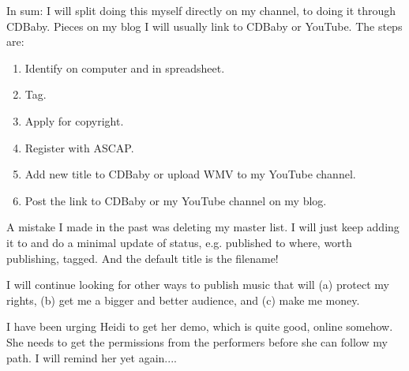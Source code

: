 \documentclass[english,11pt,letterpaper,onecolumn]{scrartcl}
\begin{document}
\noindent In sum: I will split doing this myself directly on my channel, to doing it through CDBaby. Pieces on my blog I will usually link to CDBaby or YouTube. The steps are:

\begin{enumerate}
\item Identify on computer and in spreadsheet.
\item Tag. 
\item Apply for copyright.
\item Register with ASCAP.
\item Add new title to CDBaby or upload WMV to my YouTube channel.
\item Post the link to CDBaby or my YouTube channel on my blog.
\end{enumerate}

A mistake I made in the past was deleting my master list. I will just keep adding it to and do a minimal update of status, e.g. published to where, worth publishing, tagged. And the default title is the filename!

I will continue looking for other ways to publish music that will (a) protect my rights, (b) get me a bigger and better audience, and (c) make me money.

I have been urging Heidi to get her demo, which is quite good, online somehow. She needs to get the permissions from the performers before she can follow my path. I will remind her yet again....
\end{document}
